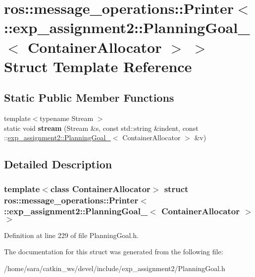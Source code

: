 \hypertarget{structros_1_1message__operations_1_1Printer_3_01_1_1exp__assignment2_1_1PlanningGoal___3_01ContainerAllocator_01_4_01_4}{}\section{ros\+:\+:message\+\_\+operations\+:\+:Printer$<$ \+:\+:exp\+\_\+assignment2\+:\+:Planning\+Goal\+\_\+$<$ Container\+Allocator $>$ $>$ Struct Template Reference}
\label{structros_1_1message__operations_1_1Printer_3_01_1_1exp__assignment2_1_1PlanningGoal___3_01ContainerAllocator_01_4_01_4}
\subsection*{Static Public Member Functions}
\begin{DoxyCompactItemize}
\item 
\mbox{\label{structros_1_1message__operations_1_1Printer_3_01_1_1exp__assignment2_1_1PlanningGoal___3_01ContainerAllocator_01_4_01_4_a545734e3e7172c50911d7557f2dbfb2f}} 
{\footnotesize template$<$typename Stream $>$ }\\static void {\bfseries stream} (Stream \&s, const std\+::string \&indent, const \+::\hyperlink{structexp__assignment2_1_1PlanningGoal__}{exp\+\_\+assignment2\+::\+Planning\+Goal\+\_\+}$<$ Container\+Allocator $>$ \&v)
\end{DoxyCompactItemize}


\subsection{Detailed Description}
\subsubsection*{template$<$class Container\+Allocator$>$\newline
struct ros\+::message\+\_\+operations\+::\+Printer$<$ \+::exp\+\_\+assignment2\+::\+Planning\+Goal\+\_\+$<$ Container\+Allocator $>$ $>$}



Definition at line 229 of file Planning\+Goal.\+h.



The documentation for this struct was generated from the following file\+:\begin{DoxyCompactItemize}
\item 
/home/sara/catkin\+\_\+ws/devel/include/exp\+\_\+assignment2/Planning\+Goal.\+h\end{DoxyCompactItemize}
